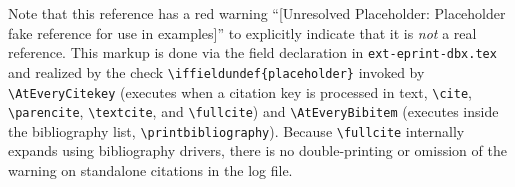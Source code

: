 \documentclass[12pt, twoside]{article}
\newcommand{\fname}[1]{\texttt{#1}}
\begin{document}
Note that this reference has a red warning \enquote{[Unresolved Placeholder: Placeholder fake reference for use in examples]} to explicitly indicate that it is \emph{not} a real reference. This markup is done via the field declaration in \fname{ext-eprint-dbx.tex} and realized by the check \texttt{\textbackslash iffieldundef\{placeholder\}} invoked by \texttt{\textbackslash AtEveryCitekey} (executes when a citation key is processed in text, \eg \texttt{\textbackslash cite}, \texttt{\textbackslash parencite}, \texttt{\textbackslash textcite}, and \texttt{\textbackslash fullcite}) and \texttt{\textbackslash AtEveryBibitem} (executes inside the bibliography list, \ie \texttt{\textbackslash printbibliography}). Because \texttt{\textbackslash fullcite} internally expands using bibliography drivers, there is no double-printing or omission of the warning on standalone citations in the log file.
\end{document}
